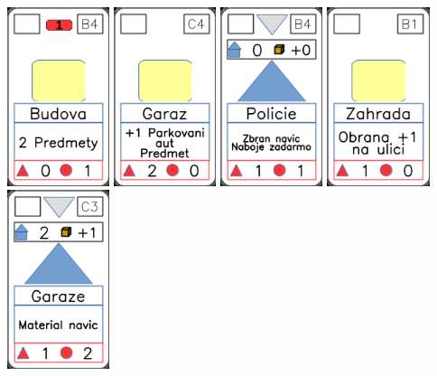 \documentclass[a4paper]{article}
\begin{document}
	\includegraphics[width=3.0cm]{img-2_8}
	\includegraphics[width=3.0cm]{img-2_13}
	\includegraphics[width=3.0cm]{img-3_8}
	\includegraphics[width=3.0cm]{img-2_20}
	\includegraphics[width=3.0cm]{img-3_12}
\end{document}
